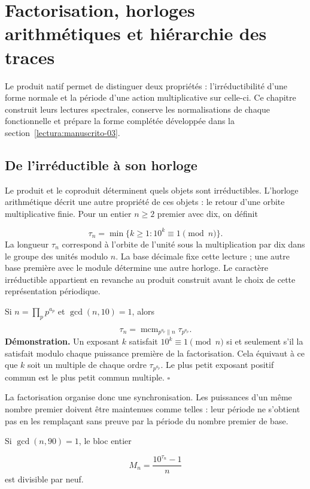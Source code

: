 \section{Factorisation, horloges arithmétiques et hiérarchie des traces}
\label{lectura:manuscrito-02}
Le produit natif permet de distinguer deux propriétés : l'irréductibilité d'une forme normale et la période d'une action multiplicative sur celle-ci. Ce chapitre construit leurs lectures spectrales, conserve les normalisations de chaque fonctionnelle et prépare la forme complétée développée dans la section~\ref{lectura:manuscrito-03}.

\subsection{De l'irréductible à son horloge}
Le produit et le coproduit déterminent quels objets sont irréductibles. L'horloge arithmétique décrit une autre propriété de ces objets : le retour d'une orbite multiplicative finie. Pour un entier $n\ge2$ premier avec dix, on définit

\[
\tau_n=\min\{k\ge1:10^k\equiv1\pmod n\}.
\]
La longueur $\tau_n$ correspond à l'orbite de l'unité sous la multiplication par dix dans le groupe des unités modulo $n$. La base décimale fixe cette lecture ; une autre base première avec le module détermine une autre horloge. Le caractère irréductible appartient en revanche au produit construit avant le choix de cette représentation périodique.

Si $n=\prod_p p^{a_p}$ et $\gcd(n,10)=1$, alors

\[
\tau_n=\operatorname{mcm}_{p^{a_p}\parallel n}\tau_{p^{a_p}}.
\]
\textbf{Démonstration.} Un exposant $k$ satisfait $10^k\equiv1\pmod n$ si et seulement s'il la satisfait modulo chaque puissance première de la factorisation. Cela équivaut à ce que $k$ soit un multiple de chaque ordre $\tau_{p^{a_p}}$. Le plus petit exposant positif commun est le plus petit commun multiple. \hfill\(\square\)

La factorisation organise donc une synchronisation. Les puissances d’un même nombre premier doivent être maintenues comme telles : leur période ne s’obtient pas en les remplaçant sans preuve par la période du nombre premier de base.

Si $\gcd(n,90)=1$, le bloc entier

\[
M_n=\frac{10^{\tau_n}-1}{n}
\]
est divisible par neuf.

